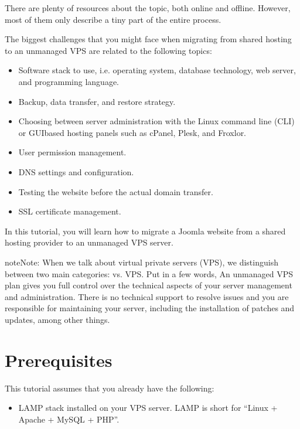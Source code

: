 \documentclass[a4paper,10pt,english,openany,oneside]{sphinxmanual}
\begin{document}
\begin{sloppypar}
\sphinxAtStartPar
There are plenty of resources about the topic, both online and offline. However, most of them only describe a tiny part of the entire process.

\sphinxAtStartPar
The biggest challenges that you might face when migrating from shared hosting to an unmanaged VPS are related to the following topics:
\begin{itemize}
\item {} 
\sphinxAtStartPar
Software stack to use, i.e. operating system, database technology, web server, and programming language.

\item {} 
\sphinxAtStartPar
Backup, data transfer, and restore strategy.

\item {} 
\sphinxAtStartPar
Choosing between server administration with the Linux command line (CLI) or GUI\sphinxhyphen{}based hosting panels such as cPanel, Plesk, and Froxlor.

\item {} 
\sphinxAtStartPar
User permission management.

\item {} 
\sphinxAtStartPar
DNS settings and configuration.

\item {} 
\sphinxAtStartPar
Testing the website before the actual domain transfer.

\item {} 
\sphinxAtStartPar
SSL certificate management.

\end{itemize}

\sphinxAtStartPar
In this tutorial, you will learn how to migrate a Joomla website from a shared hosting provider to an unmanaged VPS server.

\begin{sphinxadmonition}{note}{Note:}
\sphinxAtStartPar
When we talk about virtual private servers (VPS), we distinguish between two main categories:  vs.  VPS. Put in a few words, An unmanaged VPS plan gives you full control over the technical aspects of your server management and administration. There is no technical support to resolve issues and you are responsible for maintaining your server, including the installation of patches and updates, among other things.
\end{sphinxadmonition}


\section{Prerequisites}
\label{\detokenize{joomla-to-vps:prerequisites}}\label{\detokenize{joomla-to-vps:requirements}}
\sphinxAtStartPar
This tutorial assumes that you already have the following:
\begin{itemize}
\item {} 
\sphinxAtStartPar
LAMP stack installed on your VPS server. LAMP is short for “Linux + Apache + MySQL + PHP”.


\end{itemize}
\end{sloppypar}
\end{document}
